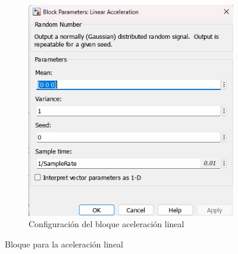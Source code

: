 \begin{figure}[htbp]
\begin{subfigure}[b]{0.45\textwidth}
        \includegraphics[width=\textwidth]{fig/Capitulo5/Caso_de_estudio_IMU/Generador_de_archivos/configuracion_bloque_aceleracion_lineal.png}
        \caption{Configuración del bloque aceleración lineal}
        \label{fig:lib_bloques_config_linear_acceleration}
    \end{subfigure}
    \caption{Bloque para la aceleración lineal}
    \label{fig:linear_accel_block_simulink}
\end{figure}


